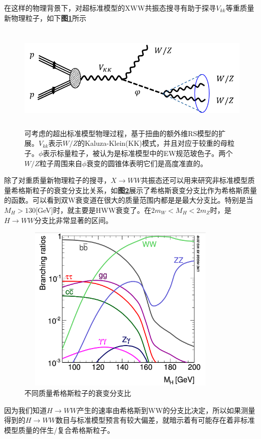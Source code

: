 在这样的物理背景下，对超标准模型的XWW共振态搜寻有助于探寻$V_{kk}$等重质量新物理粒子，如下\textbf{图\ref{fig:2.7}}所示
\begin{figure}[H]
 \centering
 \includegraphics[height=5cm, width=16cm]{pictures/Vkk.png}
  \caption{可考虑的超出标准模型物理过程，基于扭曲的额外维RS模型的扩展。$V_{kk}$表示$W/Z$的Kaluza-Klein(KK)模式，并且对应于较重的母粒子。$\phi$表示标量粒子，被认为是标准模型中的EW规范玻色子。两个$W/Z$粒子周围来自$\phi$衰变的圆锥体表明它们是高度准直的。\cite{Detecting_a_Boosted_Diboson_Resonance}}
 \label{fig:2.7}
\end{figure}

除了对重质量新物理粒子的搜寻，$X\to WW$共振态还可以用来研究非标准模型质量希格斯粒子的衰变分支比关系，如\textbf{图\ref{fig:2.8}}展示了希格斯衰变分支比作为希格斯质量的函数。可以看到双W衰变道在很大的质量范围内都是是最大分支比。特别是当$M_H>130$[GeV]时，就主要是HWW衰变了。在$2m_W<M_H<2m_Z$时，是$H\to WW$分支比非常显著的区间。
\begin{figure}[H]
 \centering
 \includegraphics[height=8cm, width=10cm]{pictures/XS-MH.png}
  \caption{不同质量希格斯粒子的衰变分支比}
 \label{fig:2.8}
\end{figure}
因为我们知道$H\to WW$产⽣的速率由希格斯到WW的分⽀⽐决定，所以如果测量得到的$H\to WW$数目与标准模型预言有较大偏差，就暗示着有可能存在着非标准模型质量的伴生/复合希格斯粒子。

